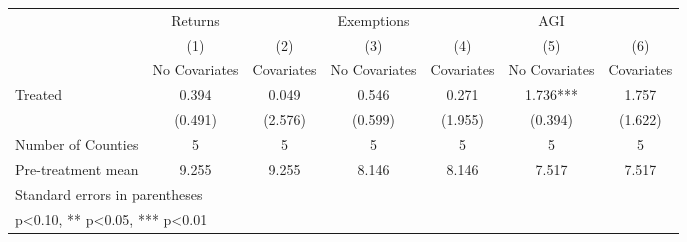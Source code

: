 {
\def\sym#1{\ifmmode^{#1}\else\(^{#1}\)\fi}
\begin{tabular}{l*{6}{c}}
\hline\hline
            &     Returns   &               &  Exemptions   &               &         AGI   &               \\
            &\multicolumn{1}{c}{(1)}&\multicolumn{1}{c}{(2)}&\multicolumn{1}{c}{(3)}&\multicolumn{1}{c}{(4)}&\multicolumn{1}{c}{(5)}&\multicolumn{1}{c}{(6)}\\
            &\multicolumn{1}{c}{No Covariates}&\multicolumn{1}{c}{Covariates}&\multicolumn{1}{c}{No Covariates}&\multicolumn{1}{c}{Covariates}&\multicolumn{1}{c}{No Covariates}&\multicolumn{1}{c}{Covariates}\\
\hline
Treated     &       0.394   &       0.049   &       0.546   &       0.271   &       1.736***&       1.757   \\
            &     (0.491)   &     (2.576)   &     (0.599)   &     (1.955)   &     (0.394)   &     (1.622)   \\
\hline
Number of Counties&           5   &           5   &           5   &           5   &           5   &           5   \\
Pre-treatment mean&       9.255   &       9.255   &       8.146   &       8.146   &       7.517   &       7.517   \\
\hline\hline
\multicolumn{7}{l}{\footnotesize Standard errors in parentheses}\\
\multicolumn{7}{l}{\footnotesize * p<0.10, ** p<0.05, *** p<0.01}\\
\end{tabular}
}
